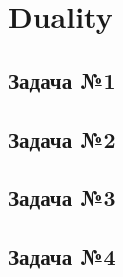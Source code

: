 \documentclass[12pt,letterpaper]{article}
\begin{document}
\newpage
\section{Duality}
\subsection*{Задача №1}
\subsection*{Задача №2}
\subsection*{Задача №3}
\subsection*{Задача №4}
\end{document}
